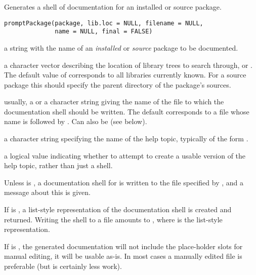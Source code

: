 %
\begin{Description}\relax
Generates a shell of documentation for an installed or source package.
\end{Description}
%
\begin{Usage}
\begin{verbatim}
promptPackage(package, lib.loc = NULL, filename = NULL,
              name = NULL, final = FALSE)
\end{verbatim}
\end{Usage}
%
\begin{Arguments}
\begin{ldescription}
\item[\code{package}] a  string with the name of an
\emph{installed} or \emph{source} package to be documented.
\item[\code{lib.loc}] a character vector describing the location of \R{}
library trees to search through, or .  The default value
of  corresponds to all libraries currently known.  For a
source package this should specify the parent directory of the
package's sources.
\item[\code{filename}] usually, a  or a character string giving the
name of the file to which the documentation shell should be written.
The default corresponds to a file whose name is  followed
by .  Can also be  (see below).
\item[\code{name}] a character string specifying the name of the help topic,
typically of the form .
\item[\code{final}] a logical value indicating whether to attempt to
create a usable version of the help topic, rather than just a shell.
\end{ldescription}
\end{Arguments}
%
\begin{Details}\relax
Unless  is , a documentation shell for
 is written to the file specified by , and
a message about this is given.

If  is , a list-style representation of the
documentation shell is created and returned.  Writing the shell to a
file amounts to ,
where  is the list-style representation.

If  is , the generated documentation will not
include the place-holder slots for manual editing, it will be usable
as-is.  In most cases a manually edited file is preferable (but
 is certainly less work).
\end{Details}
